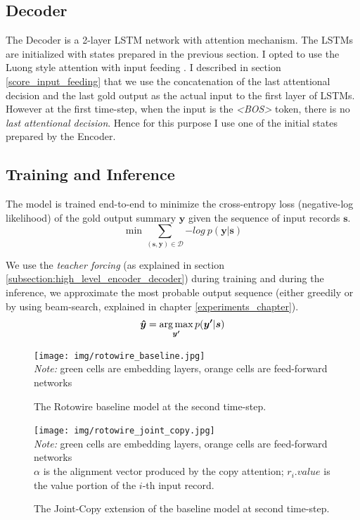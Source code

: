 \subsection{Decoder}

The Decoder is a 2-layer LSTM network with attention mechanism. The LSTMs are initialized with states prepared in the previous section. I opted to use the Luong style attention with input feeding \citep{luong2015effective}. I described in section \ref{score_input_feeding} that we use the concatenation of the last attentional decision and the last gold output as the actual input to the first layer of LSTMs. However at the first time-step, when the input is the \emph{\textless BOS\textgreater} token, there is no \emph{last attentional decision}. Hence for this purpose I use one of the initial states prepared by the Encoder.

\subsection{Training and Inference}

The model is trained end-to-end to minimize the cross-entropy loss (negative-log likelihood) of the gold output summary $\boldsymbol{y}$ given the sequence of input records $\boldsymbol{s}$.
\begin{equation}
    \min \sum_{(\boldsymbol{s}, \boldsymbol{y}) \in \mathcal{D} }{-log\ p(\boldsymbol{y}|\boldsymbol{s})}
\end{equation}

We use the \emph{teacher forcing} (as explained in section \ref{subsection:high_level_encoder_decoder}) during training and during the inference, we approximate the most probable output sequence (either greedily or by using beam-search, explained in chapter \ref{experiments_chapter}).
\begin{equation}
    \boldsymbol{\hat{y}} = \operatorname*{arg\,max}_{\boldsymbol{y'}} p(\boldsymbol{y'} | \boldsymbol{s})
\end{equation}

\begin{figure}[!h]
    \centering
    \texttt{[image: img/rotowire\_baseline.jpg]}
    \footnotesize{\\ \textit{Note:} green cells are embedding layers, orange cells are feed-forward networks}
    \caption{\centering The Rotowire baseline model at the second time-step.} \label{rotowire_baseline_vis}
\end{figure}

\begin{figure}[!h]
    \centering
    \texttt{[image: img/rotowire\_joint\_copy.jpg]}
    \footnotesize{\\ \textit{Note:} green cells are embedding layers, orange cells are feed-forward networks \\ $\alpha$ is the alignment vector produced by the copy attention; $r_i.value$ is the value portion of the $i$-th input record.}
    \caption{\centering The Joint-Copy extension of the baseline model at second time-step.} \label{rotowire_joint_copy_vis}
\end{figure}

